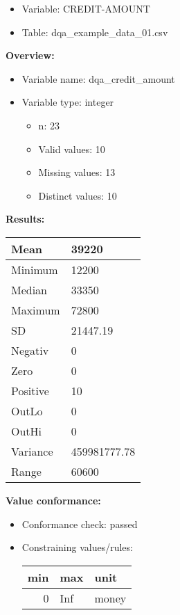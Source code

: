 \documentclass[
]{article}
\providecommand{\tightlist}{%
  \setlength{\itemsep}{0pt}\setlength{\parskip}{0pt}}
\begin{document}
\begin{itemize}
\tightlist
\item
  Variable: CREDIT-AMOUNT
\item
  Table: dqa\_example\_data\_01.csv
\end{itemize}

\textbf{Overview:}

\begin{itemize}
\tightlist
\item
  Variable name: dqa\_credit\_amount
\item
  Variable type: integer

  \begin{itemize}
  \tightlist
  \item
    n: 23
  \item
    Valid values: 10
  \item
    Missing values: 13
  \item
    Distinct values: 10
  \end{itemize}
\end{itemize}

\textbf{Results:}\\

\begin{table}[H]
\centering
\begin{tabular}{l|l}
\hline
Mean & 39220\\
\hline
Minimum & 12200\\
\hline
Median & 33350\\
\hline
Maximum & 72800\\
\hline
SD & 21447.19\\
\hline
Negativ & 0\\
\hline
Zero & 0\\
\hline
Positive & 10\\
\hline
OutLo & 0\\
\hline
OutHi & 0\\
\hline
Variance & 459981777.78\\
\hline
Range & 60600\\
\hline
\end{tabular}
\end{table}

\textbf{Value conformance:}

\begin{itemize}
\tightlist
\item
  Conformance check: passed
\item
  Constraining values/rules:

  \begin{table}[H]
  \centering
  \begin{tabular}{r|l|l}
  \hline
  \textbf{min} & \textbf{max} & \textbf{unit}\\
  \hline
  0 & Inf & money\\
  \hline
  \end{tabular}
  \end{table}
\end{itemize}
\end{document}
